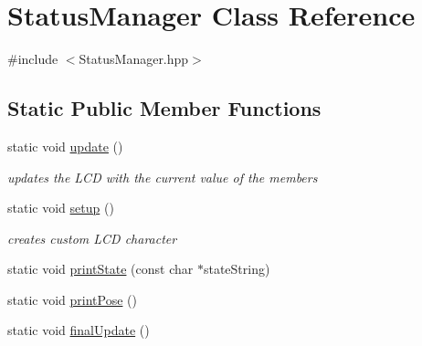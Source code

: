 \hypertarget{classStatusManager}{\section{Status\-Manager Class Reference}
\label{classStatusManager}
}


{\ttfamily \#include $<$Status\-Manager.\-hpp$>$}

\subsection*{Static Public Member Functions}
\begin{DoxyCompactItemize}
\item 
static void \hyperlink{classStatusManager_a1e349aaaaaafe34873aa39e9dee621b0}{update} ()
\begin{DoxyCompactList}\small\item\em updates the L\-C\-D with the current value of the members \end{DoxyCompactList}\item 
static void \hyperlink{classStatusManager_ad95281dfa485185d334183e9570d85af}{setup} ()
\begin{DoxyCompactList}\small\item\em creates custom L\-C\-D character \end{DoxyCompactList}\item 
static void \hyperlink{classStatusManager_a384e6af33f26993bd070f40fc601eeef}{print\-State} (const char $\ast$state\-String)
\item 
static void \hyperlink{classStatusManager_a9931fbceb4e172cb68ad0e23db6f0a8c}{print\-Pose} ()
\item 
static void \hyperlink{classStatusManager_a7ff2d1d408a9a295a7e7815ce23347c4}{final\-Update} ()
\end{DoxyCompactItemize}

